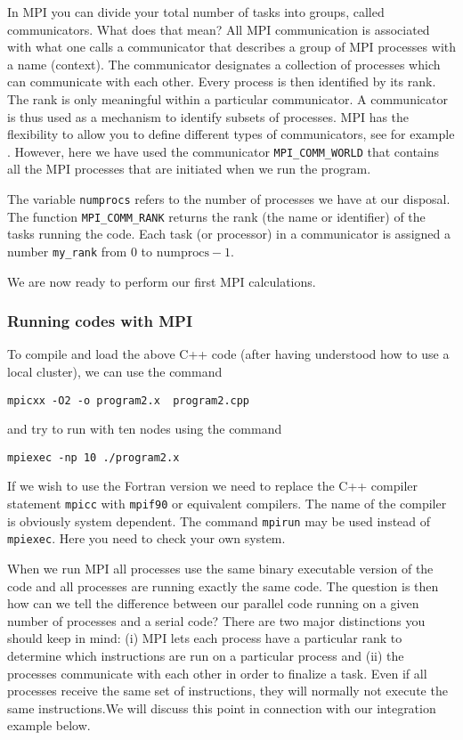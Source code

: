 In MPI you can divide your total number of tasks into groups, 
called communicators. What  does that mean?
All MPI communication is associated with what one calls a communicator
that describes a  group of MPI processes with a name (context). 
The communicator  designates a collection of processes which can communicate with each other. 
Every  process is then identified by its rank. The rank is only meaningful
within a particular communicator.  A communicator is thus used as a mechanism to identify subsets of processes.  
MPI has the flexibility to allow you to
define different types of communicators, see for example \cite{mpiref}. However,  here we have used the
communicator \lstinline{MPI_COMM_WORLD} that contains all the MPI
processes that are initiated when we run the program.

The variable \lstinline{numprocs} refers to the number of processes we have at our disposal.
The function \lstinline{MPI_COMM_RANK} returns the rank 
(the name or identifier) of the tasks running the code. 
Each task (or processor) in a communicator is assigned a number \lstinline{my_rank} from  $0$ to $\mathrm{numprocs}-1$. 

We are now ready to perform our first MPI calculations.

\subsubsection{Running codes with MPI}
To compile and load the above C++ code (after having understood how to use a local cluster), 
we can use the command 
\begin{svgraybox}
\begin{verbatim}
mpicxx -O2 -o program2.x  program2.cpp
\end{verbatim}
\end{svgraybox}
and try to run with ten nodes using the command
\begin{svgraybox}
\begin{verbatim}
mpiexec -np 10 ./program2.x
\end{verbatim}
 \end{svgraybox}
If we wish to use  the Fortran version we need to replace the C++ compiler statement \lstinline{mpicc}
with \lstinline{mpif90} or equivalent compilers.  The name of the compiler is obviously system dependent.  
The command \lstinline{mpirun} may be used instead of \lstinline{mpiexec}.  Here you need to check your own
system.

When we run MPI all processes use the same  binary executable version of the code and all processes are running
exactly the same code. The question is then how can we tell the difference between our parallel
code running on a given number of processes and a serial code?
There are two major distinctions you should keep in mind: (i) MPI lets each process have a particular rank
to determine which instructions are run on a particular process and (ii) the processes communicate with each
other in order to finalize a task. Even if all processes receive the same set of instructions, they will normally
not execute the same instructions.We will discuss  this point in connection with our integration example below.
 
